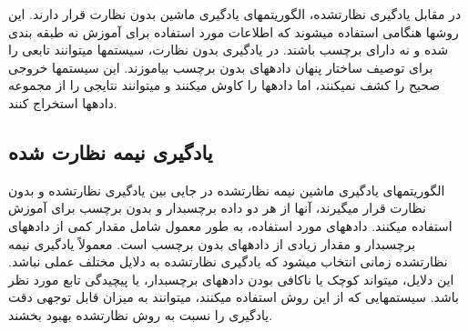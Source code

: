 در مقابل  یادگیری نظارت\nf شده، الگوریتم\nf های یادگیری ماشین بدون نظارت قرار دارند. این روش\nf ها هنگامی استفاده می\nf شوند که اطلاعات مورد استفاده برای آموزش نه طبقه بندی شده و نه دارای برچسب باشند. در یادگیری بدون نظارت، سیستم\nf ها می\nf توانند تابعی را برای توصیف ساختار پنهان داده\nf های بدون برچسب بیاموزند. این سیستم\nf ها خروجی صحیح را کشف نمی\nf کنند، اما داده\nf ها را کاوش می\nf کنند و می\nf توانند نتایجی را از مجموعه داده\nf ها استخراج کنند.


\subsection{یادگیری نیمه نظارت شده}

الگوریتم\nf های یادگیری ماشین نیمه نظارت\nf شده در جایی بین یادگیری نظارت\nf شده و بدون نظارت قرار می\nf گیرند، آن\nf ها از هر دو داده برچسب\nf دار و بدون برچسب برای آموزش استفاده می\nf کنند. داده\nf های مورد استفاده، به طور معمول شامل مقدار کمی از داده\nf های برچسب\nf دار و مقدار زیادی از داده\nf های بدون برچسب است. معمولاً یادگیری نیمه نظارت\nf شده زمانی انتخاب می\nf شود که یادگیری نظارت\nf شده به دلایل مختلف عملی نباشد. این دلایل، می\nf تواند کوچک یا ناکافی بودن داده\nf های برچسب\nf دار، یا پیچیدگی تابع مورد نظر باشد. سیستم\nf هایی که از این روش استفاده می\nf کنند، می\nf توانند به میزان قابل توجهی دقت یادگیری را نسبت به روش نظارت\nf شده بهبود بخشند. 

